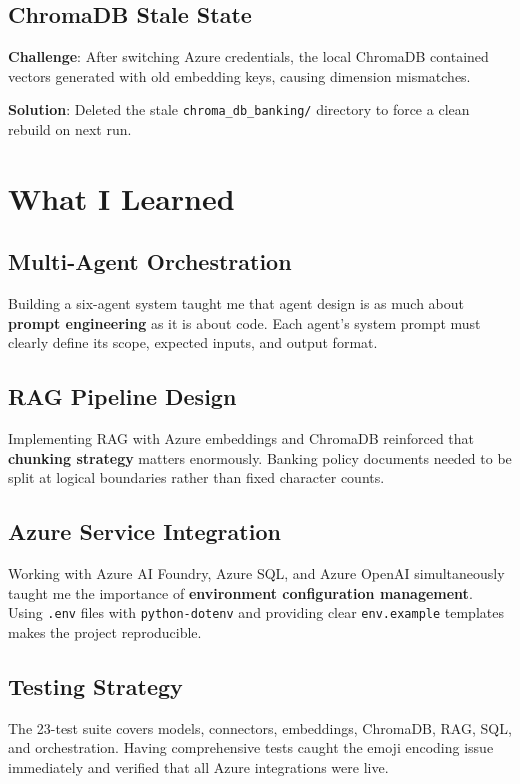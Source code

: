 \documentclass[12pt,a4paper]{article}
\begin{document}
\subsection{ChromaDB Stale State}

\textbf{Challenge}: After switching Azure credentials, the local ChromaDB contained
vectors generated with old embedding keys, causing dimension mismatches.

\textbf{Solution}: Deleted the stale \texttt{chroma\_db\_banking/} directory to force a
clean rebuild on next run.

\section{What I Learned}

\subsection{Multi-Agent Orchestration}
Building a six-agent system taught me that agent design is as much about
\textbf{prompt engineering} as it is about code. Each agent's system prompt must
clearly define its scope, expected inputs, and output format.

\subsection{RAG Pipeline Design}
Implementing RAG with Azure embeddings and ChromaDB reinforced that
\textbf{chunking strategy} matters enormously. Banking policy documents needed
to be split at logical boundaries rather than fixed character counts.

\subsection{Azure Service Integration}
Working with Azure AI Foundry, Azure SQL, and Azure OpenAI simultaneously
taught me the importance of \textbf{environment configuration management}.
Using \texttt{.env} files with \texttt{python-dotenv} and providing clear
\texttt{env.example} templates makes the project reproducible.

\subsection{Testing Strategy}
The 23-test suite covers models, connectors, embeddings, ChromaDB, RAG, SQL,
and orchestration. Having comprehensive tests caught the emoji encoding issue
immediately and verified that all Azure integrations were live.
\end{document}
